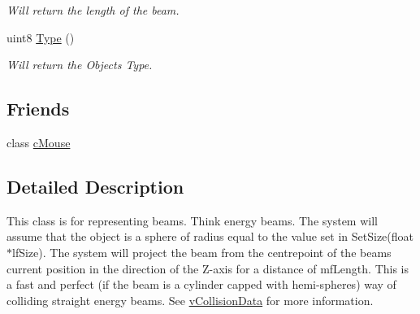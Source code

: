 \begin{DoxyCompactItemize}
\begin{DoxyCompactList}\small\item\em Will return the length of the beam. \end{DoxyCompactList}\item 
\hypertarget{classc_beam_collision_ab7a645cc905fc9c62bfd6a1440d349b1}{
uint8 \hyperlink{classc_beam_collision_ab7a645cc905fc9c62bfd6a1440d349b1}{Type} ()}
\label{classc_beam_collision_ab7a645cc905fc9c62bfd6a1440d349b1}

\begin{DoxyCompactList}\small\item\em Will return the Objects Type. \end{DoxyCompactList}\end{DoxyCompactItemize}
\subsection*{Friends}
\begin{DoxyCompactItemize}
\item 
\hypertarget{classc_beam_collision_a70bfdc2c4682463db2e7755ec3e6440e}{
class \hyperlink{classc_beam_collision_a70bfdc2c4682463db2e7755ec3e6440e}{cMouse}}
\label{classc_beam_collision_a70bfdc2c4682463db2e7755ec3e6440e}

\end{DoxyCompactItemize}


\subsection{Detailed Description}
This class is for representing beams. Think energy beams. The system will assume that the object is a sphere of radius equal to the value set in SetSize(float $\ast$lfSize). The system will project the beam from the centrepoint of the beams current position in the direction of the Z-\/axis for a distance of mfLength. This is a fast and perfect (if the beam is a cylinder capped with hemi-\/spheres) way of colliding straight energy beams. See \hyperlink{classv_collision_data}{vCollisionData} for more information. 